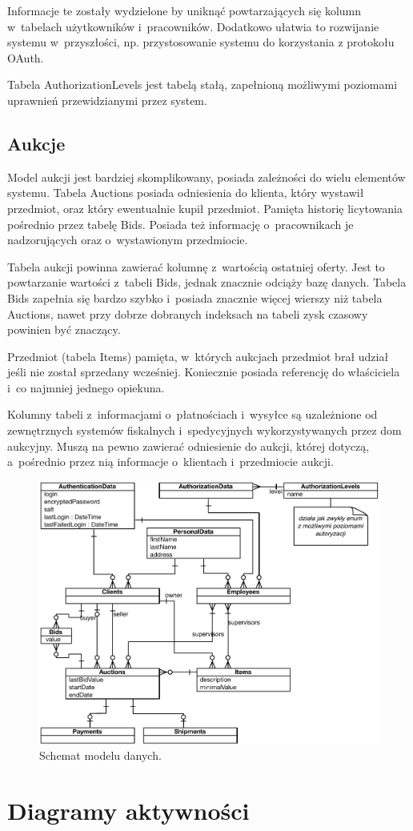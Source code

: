 \documentclass[10pt,a4paper]{article}
\newcommand{\s}[1]{\textsf{#1}}
\begin{document}
Informacje te zostały wydzielone by uniknąć powtarzających się kolumn
w~tabelach użytkowników i~pracowników. Dodatkowo ułatwia to rozwijanie systemu
w~przyszłości, np. przystosowanie systemu do korzystania z protokołu OAuth.

Tabela \s{AuthorizationLevels} jest tabelą stałą, zapełnioną możliwymi
poziomami uprawnień przewidzianymi przez system.

\subsection{Aukcje}

Model aukcji jest bardziej skomplikowany, posiada zależności do wielu elementów
systemu. Tabela \s{Auctions} posiada odniesienia do klienta, który wystawił
przedmiot, oraz który ewentualnie kupił przedmiot. Pamięta historię licytowania
pośrednio przez tabelę \s{Bids}. Posiada też informację o~pracownikach je
nadzorujących oraz o~wystawionym przedmiocie.

Tabela aukcji powinna zawierać kolumnę z~wartością ostatniej oferty. Jest to
powtarzanie wartości z~tabeli \s{Bids}, jednak znacznie odciąży bazę danych.
Tabela \s{Bids} zapełnia się bardzo szybko i~posiada znacznie więcej wierszy
niż tabela \s{Auctions}, nawet przy dobrze dobranych indeksach na tabeli zysk
czasowy powinien być znaczący.

Przedmiot (tabela \s{Items}) pamięta, w~których aukcjach przedmiot brał udział
jeśli nie został sprzedany wcześniej. Koniecznie posiada referencję do
właściciela i~co najmniej jednego opiekuna.

Kolumny tabeli z~informacjami o~płatnościach i~wysyłce są uzależnione od
zewnętrznych systemów fiskalnych i~spedycyjnych wykorzystywanych przez dom
aukcyjny. Muszą na pewno zawierać odniesienie do aukcji, której dotyczą,
a~pośrednio przez nią informacje o~klientach i~przedmiocie aukcji.

\begin{figure}[p]
  \begin{adjustwidth}{-2cm}{-2cm}
    \centering
    \includegraphics{figury/model-danych}
    \caption{Schemat modelu danych.}
    \label{fig:model_danych}
  \end{adjustwidth}
\end{figure}

\newpage
\section{Diagramy aktywności}
\end{document}
